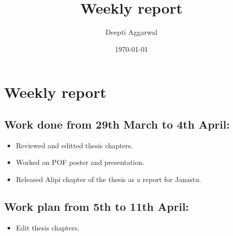\documentclass[11pt]{article}
\title{Weekly report}
\author{Deepti Aggarwal}
\date{\today}
\begin{document}
\maketitle

\setcounter{tocdepth}{3}
\vspace*{1cm}
\section{Weekly report}
\label{sec-1}

\subsection{Work done from 29th March to 4th April:}
\label{sec-1-1}
\begin{itemize}
\item Reviewed and editted thesis chapters.
\item Worked on POF poster and presentation.
\item Released Alipi chapter of the thesis as a report for Janastu.
\end{itemize}


\subsection{Work plan from 5th to 11th April:}
\label{sec-1-1}
\begin{itemize}
\item Edit thesis chapters.
\end{itemize}
\end{document}

